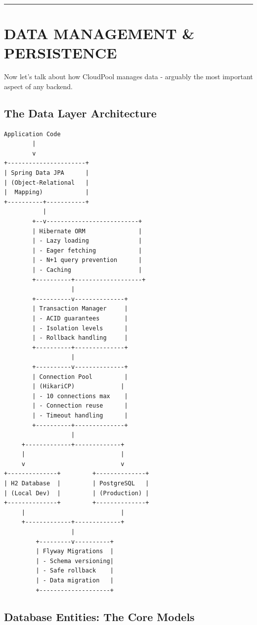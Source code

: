 \documentclass[11pt,a4paper]{report}
\begin{document}
\vfill\hrule\vfill



\part{DATA MANAGEMENT \& PERSISTENCE}


Now let's talk about how CloudPool manages data - arguably the most important aspect of any backend.


\chapter{The Data Layer Architecture}


\begin{lstlisting}[language=text]
Application Code
        |
        v
+----------------------+
| Spring Data JPA      |
| (Object-Relational   |
|  Mapping)            |
+----------+-----------+
           |
        +--v--------------------------+
        | Hibernate ORM               |
        | - Lazy loading              |
        | - Eager fetching            |
        | - N+1 query prevention      |
        | - Caching                   |
        +----------+-------------------+
                   |
        +----------v--------------+
        | Transaction Manager     |
        | - ACID guarantees       |
        | - Isolation levels      |
        | - Rollback handling     |
        +----------+--------------+
                   |
        +----------v--------------+
        | Connection Pool         |
        | (HikariCP)             |
        | - 10 connections max    |
        | - Connection reuse      |
        | - Timeout handling      |
        +----------+--------------+
                   |
     +-------------+-------------+
     |                           |
     v                           v
+--------------+         +--------------+
| H2 Database  |         | PostgreSQL   |
| (Local Dev)  |         | (Production) |
+--------------+         +--------------+
     |                           |
     +-------------+-------------+
                   |
         +---------v----------+
         | Flyway Migrations  |
         | - Schema versioning|
         | - Safe rollback    |
         | - Data migration   |
         +--------------------+
\end{lstlisting}


\chapter{Database Entities: The Core Models}
\end{document}
